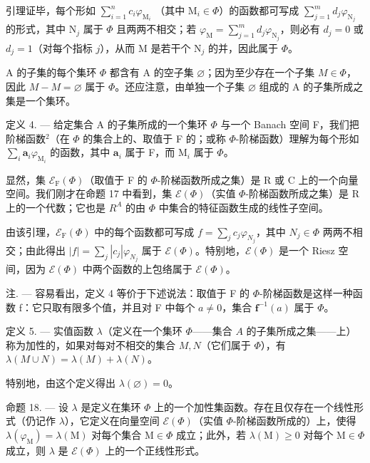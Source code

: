 引理证毕，每个形如 \(\sum_{i=1}^{n} c_i \varphi_{\mathrm{M}_i}\) （其中 \(\mathrm{M}_i \in \Phi\)）的函数都可写成 \(\sum_{j=1}^{m} d_j \varphi_{\mathrm{N}_j}\) 的形式，其中 \(\mathrm{N}_j\) 属于 \(\Phi\) 且两两不相交；若 \(\varphi_{\mathrm{M}} = \sum_{j=1}^{m} d_j \varphi_{\mathrm{N}_j}\)，则必有 \(d_j = 0\) 或 \(d_j = 1\)（对每个指标 \(j\)），从而 \(\mathrm{M}\) 是若干个 \(\mathrm{N}_j\) 的并，因此属于 \(\Phi\)。

A 的子集的每个集环 \(\Phi\) 都含有 A 的空子集 \(\varnothing\)；因为至少存在一个子集 \(M \in \Phi\)，因此 \(M - M = \varnothing\) 属于 \(\Phi\)。还应注意，由单独一个子集 \(\varnothing\) 组成的 A 的子集所成之集是一个集环。

定义 4. --- 给定集合 A 的子集所成的一个集环 \(\Phi\) 与一个 Banach 空间 F，我们把阶梯函数\(^{2}\)（在 \(\Phi\) 的集合上的、取值于 F 的；或称 \(\Phi\)-阶梯函数）理解为每个形如 \(\sum_{i} \mathbf{a}_{i} \varphi_{\mathrm{M}_{i}}\) 的函数，其中 \(\mathbf{a}_{i}\) 属于 F，而 \(\mathrm{M}_{i}\) 属于 \(\Phi\)。

显然，集 \(\mathcal{E}_{\mathrm{F}}(\Phi)\)（取值于 F 的 \(\Phi\)-阶梯函数所成之集）是 R 或 C 上的一个向量空间。我们刚才在命题 17 中看到，集 \(\mathcal{E}(\Phi)\)（实值 \(\Phi\)-阶梯函数所成之集）是 R 上的一个代数；它也是 \(R^{A}\) 的由 \(\Phi\) 中集合的特征函数生成的线性子空间。

由该引理，\(\mathcal{E}_{\mathrm{F}}(\Phi)\) 中的每个函数都可写成 \(f = \sum_{j} c_{j} \varphi_{N_{j}}\)，其中 \(N_{j} \in \Phi\) 两两不相交；由此得出 \(|f| = \sum_{j} |c_{j}| \varphi_{N_{j}}\) 属于 \(\mathcal{E}(\Phi)\)。特别地，\(\mathcal{E}(\Phi)\) 是一个 Riesz 空间，因为 \(\mathcal{E}(\Phi)\) 中两个函数的上包络属于 \(\mathcal{E}(\Phi)\)。

注. --- 容易看出，定义 4 等价于下述说法：取值于 F 的 \(\Phi\)-阶梯函数是这样一种函数 f：它只取有限多个值，并且对 F 中每个 \(a \neq 0\)，集合 \(\mathbf{f}^{-1}(a)\) 属于 \(\Phi\)。

定义 5. --- 实值函数 \(\lambda\)（定义在一个集环 \(\Phi\)——集合 \(A\) 的子集所成之集——上）称为加性的，如果对每对不相交的集合 \(M, N\)（它们属于 \(\Phi\)），有 \(\lambda(M \cup N) = \lambda(M) + \lambda(N)\)。

特别地，由这个定义得出 \(\lambda(\varnothing)=0\)。

命题 18. --- 设 \(\lambda\) 是定义在集环 \(\Phi\) 上的一个加性集函数。存在且仅存在一个线性形式（仍记作 \(\lambda\)），它定义在向量空间 \(\mathcal{E}(\Phi)\)（实值 \(\Phi\)-阶梯函数所成的）上，使得 \(\lambda(\varphi_{\mathrm{M}}) = \lambda(\mathrm{M})\) 对每个集合 \(\mathrm{M} \in \Phi\) 成立；此外，若 \(\lambda(\mathrm{M}) \geqslant 0\) 对每个 \(\mathrm{M} \in \Phi\) 成立，则 \(\lambda\) 是 \(\mathcal{E}(\Phi)\) 上的一个正线性形式。

